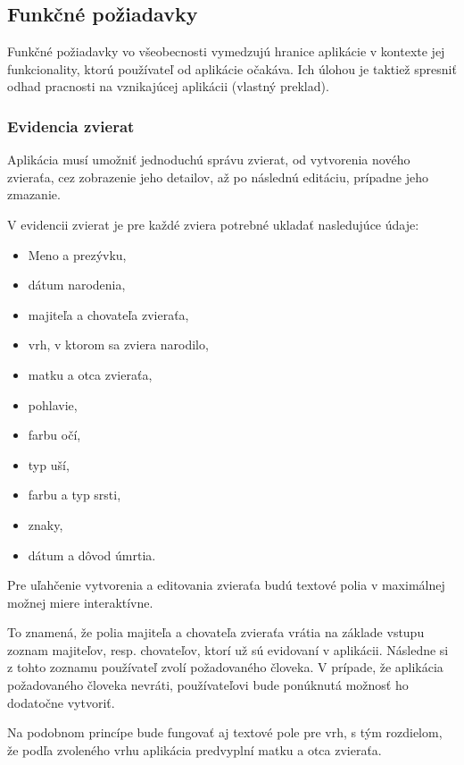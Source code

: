 \subsection{Funkčné požiadavky}\label{funkcne-poziadavky}
Funkčné požiadavky vo všeobecnosti vymedzujú hranice aplikácie v kontexte jej funkcionality, ktorú používateľ od aplikácie očakáva. Ich úlohou je taktiež spresniť odhad pracnosti na vznikajúcej aplikácii \cite{co-su-pripady-pouzitia} (vlastný preklad).

\subsubsection{Evidencia zvierat}\label{evidencia-zvierat}
Aplikácia musí umožniť jednoduchú správu zvierat, od vytvorenia nového zvieraťa, cez zobrazenie jeho detailov, až po následnú editáciu, prípadne jeho zmazanie.

\hfill \break
V evidencii zvierat je pre každé zviera potrebné ukladať nasledujúce údaje:

\begin{itemize}
	\item Meno a prezývku,
	\item dátum narodenia,
	\item majiteľa a chovateľa zvieraťa,
	\item vrh, v ktorom sa zviera narodilo,
	\item matku a otca zvieraťa,
	\item pohlavie,
	\item farbu očí,
	\item typ uší,
	\item farbu a typ srsti,
	\item znaky,
	\item dátum a dôvod úmrtia.
\end{itemize}

Pre uľahčenie vytvorenia a editovania zvieraťa budú textové polia v maximálnej možnej miere interaktívne.

To znamená, že polia majiteľa a chovateľa zvieraťa vrátia na základe vstupu zoznam majiteľov, resp. chovateľov, ktorí už sú evidovaní v aplikácii. Následne si z tohto zoznamu používateľ zvolí požadovaného človeka.
V prípade, že aplikácia požadovaného človeka nevráti, používateľovi bude ponúknutá možnosť ho dodatočne vytvoriť.

Na podobnom princípe bude fungovať aj textové pole pre vrh, s tým rozdielom, že podľa zvoleného vrhu aplikácia predvyplní matku a otca zvieraťa.
 

